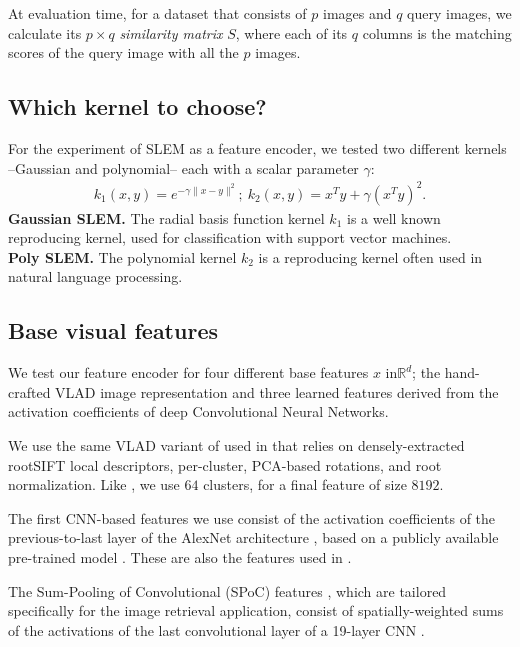 At evaluation time, for a dataset that consists of $p$ images and $q$ query images, we calculate its $p\times q$ \emph{similarity matrix} $S$, where each of its $q$ columns is the matching scores of the query image with all the $p$ images. 


\subsection{Which kernel to choose?}
For the experiment of SLEM as a feature encoder, we tested two different kernels --Gaussian and polynomial-- each with a scalar parameter $\gamma$:
\begin{align}
    k_1(x,y) = e^{-\gamma\|x-y \|^2}; \ 
    k_2(x,y) = x^Ty+\gamma(x^Ty)^2. \label{kernels}
\end{align}
\textbf{Gaussian SLEM.} The radial basis function kernel $k_1$ is a
well known reproducing kernel, used for classification with support vector machines.\\
\textbf{Poly SLEM.} The polynomial kernel $k_2$ is a reproducing kernel often used in natural language processing.



\subsection{Base visual features}
We test our feature encoder for four different base features $x$ in$\mathbb{R}^d$; the hand-crafted VLAD image representation and three learned features derived from the activation coefficients of deep Convolutional Neural Networks.

We use the same VLAD variant of \cite{Delhumeau2013} used in \cite{ZePe15} that relies on densely-extracted rootSIFT \cite{3things} local descriptors, per-cluster, PCA-based rotations, and root normalization. Like \cite{ZePe15}, we use $64$ clusters, for a final feature of size $8192$.

The first CNN-based features we use consist of the activation coefficients of the previous-to-last layer of the AlexNet architecture \cite{Krizhevsky2012}, based on a publicly available pre-trained model \cite{jia2014caffe}. These are also the features used in \cite{ZePe15}.

The Sum-Pooling of Convolutional (SPoC) features \cite{babenko15}, which are tailored specifically for the image retrieval application, consist of spatially-weighted sums of the activations of the last convolutional layer of a 19-layer CNN \cite{SimonZisser15}.

